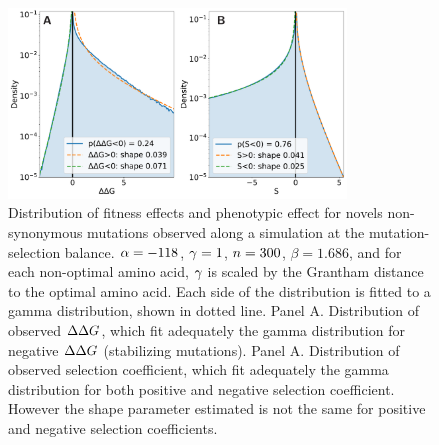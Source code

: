 \documentclass{article}
\begin{document}
\begin{figure}[H]
    \centering
    \includegraphics[width=0.8\textwidth] {DPE-DFE.pdf}
    \caption[Distribution of fitness effects and phenotypic effect]{
    Distribution of fitness effects and phenotypic effect for novels {non-synonymous} mutations observed along a simulation at the mutation-selection balance.
    $\alpha=-118$, $\gamma=1$, $n=300$, $\beta=1.686$, and for each non-optimal amino acid, $\gamma$ is scaled by the Grantham distance to the optimal amino acid.
    Each side of the distribution is fitted to a gamma distribution, shown in dotted line.
    Panel A. Distribution of observed $\Delta \Delta G$, which fit adequately the gamma distribution for negative $\Delta \Delta G$ (stabilizing mutations).
    Panel A. Distribution of observed selection coefficient, which fit adequately the gamma distribution for both positive and negative selection coefficient. However the shape parameter estimated is not the same for positive and negative selection coefficients.
    }
\end{figure}

    
\end{document}
